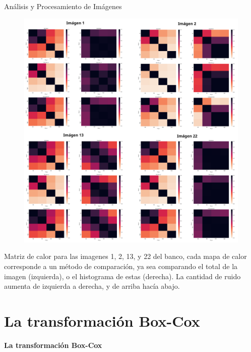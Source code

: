 \documentclass{beamer}
\begin{document}
\begin{frame}{Análisis y Procesamiento de Imágenes}
    \begin{figure}[H]
        \centering
        \includegraphics[width=\textwidth]{heatmap_all.png}
    \end{figure}
    Matriz de calor para las imagenes 1, 2, 13, y 22 del banco, cada mapa de calor corresponde a un m\'etodo de comparaci\'on, ya sea comparando el total de la imagen (izquierda), o el histograma de estas (derecha). La cantidad de ruido aumenta de izquierda a derecha, y de arriba hacía abajo.
\end{frame}
\section{La transformación Box-Cox}

\begin{frame}
    \begin{center}
        {\LARGE\bf La transformación Box-Cox}
    \end{center}
\end{frame}
\end{document}
